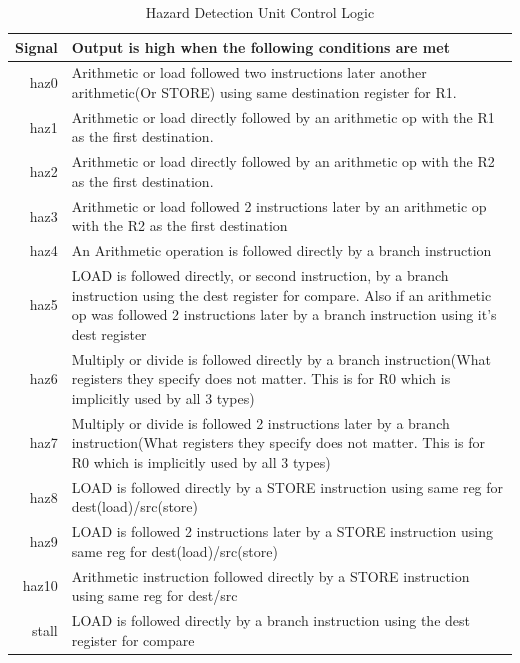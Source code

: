 		\begin{table}[htpb]
		        \caption{Hazard Detection Unit Control Logic}
		        \label{HDU_COND}
		        \centering
		        \begin{tabular}{r | p{7cm}}
		        Signal          & Output is high when the following conditions are met\\
		        \hline
		        \hline
		        haz0			& Arithmetic or load followed two instructions later another arithmetic(Or STORE) using same destination register for R1. \\
		        \hline
		        haz1  			& Arithmetic or load directly followed by an arithmetic op with the R1 as the first destination. \\
		        \hline
		        haz2			& Arithmetic or load directly followed by an arithmetic op with the R2 as the first destination. \\
		        \hline
		        haz3			& Arithmetic or load followed 2 instructions later by an arithmetic op with the R2 as the first destination \\
		        \hline
		        haz4			& An Arithmetic operation is followed directly by a branch instruction   \\
		        \hline
		        haz5			& LOAD is followed directly, or second instruction, by a branch instruction using the dest register for compare. Also if an arithmetic op was followed 2 instructions later by a branch instruction using it's dest register \\
		        \hline
		        haz6			& Multiply or divide is followed directly by a branch instruction(What registers they specify does not matter. This is for R0 which is implicitly used by all 3 types) \\
		        \hline
		        haz7			& Multiply or divide is followed 2 instructions later by a branch instruction(What registers they specify does not matter. This is for R0 which is implicitly used by all 3 types) \\
		        \hline
		        haz8			& LOAD is followed directly by a STORE instruction using same reg for dest(load)/src(store) \\
		        \hline
		        haz9			& LOAD is followed 2 instructions later by a STORE instruction using same reg for 
		        dest(load)/src(store) \\
		        \hline
		        haz10			& Arithmetic instruction followed directly by a STORE instruction using same reg for dest/src \\
		        \hline
		        stall			& LOAD is followed directly by a branch instruction using the dest register for compare \\
		        \end{tabular}
		\end{table}
	\FloatBarrier
	\clearpage
